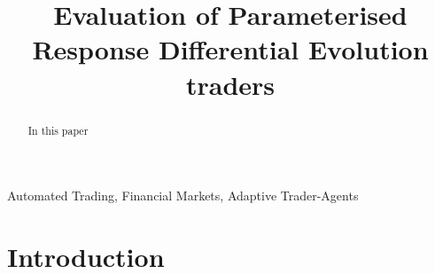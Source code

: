 \documentclass[conference]{IEEEtran}
\begin{document}
\title{Evaluation of Parameterised Response Differential Evolution traders}

\author{
}

\maketitle

\begin{abstract}
In this paper
\end{abstract}

\begin{IEEEkeywords}
Automated Trading, Financial Markets, Adaptive Trader-Agents
\end{IEEEkeywords}

\section{Introduction}

\cite{BSE} \cite{BSEPaper}



\end{document}
